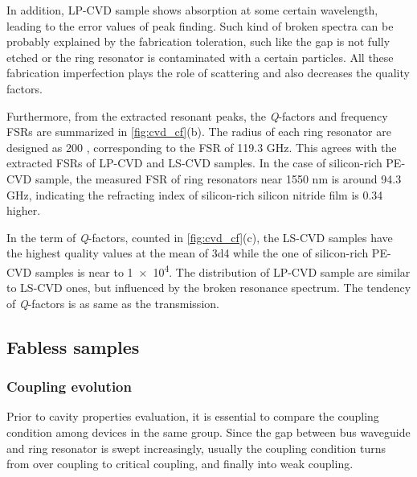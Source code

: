In addition, LP-CVD sample shows absorption at some certain wavelength, leading to the error values of peak finding. Such kind of broken spectra can be probably explained by the fabrication toleration, such like the gap is not fully etched or the ring resonator is contaminated with a certain particles. All these fabrication imperfection plays the role of scattering and also decreases the quality factors.

Furthermore, from the extracted resonant peaks, the \textit{Q}-factors and frequency FSRs are summarized in \autoref{fig:cvd_cf}(b). The radius of each ring resonator are designed as 200 \um, corresponding to the FSR of 119.3 GHz. This agrees with the extracted FSRs of LP-CVD and LS-CVD samples. In the case of silicon-rich PE-CVD sample, the measured FSR of ring resonators near 1550 nm is around 94.3 GHz, indicating the refracting index of silicon-rich silicon nitride film is 0.34 higher.

In the term of \textit{Q}-factors, counted in \autoref{fig:cvd_cf}(c), the LS-CVD samples have the highest quality values at the mean of \num{3d4} while the one of silicon-rich PE-CVD samples is near to \num{1e4}. The distribution of LP-CVD sample are similar to LS-CVD ones, but influenced by the broken resonance spectrum. The tendency of \textit{Q}-factors is as same as the transmission.

\begin{figure}
	\centering
	
	\label{fig:cvd_cf}
\end{figure}



\subsection{Fabless samples}

\subsubsection{Coupling evolution}

Prior to cavity properties evaluation, it is essential to compare the coupling condition among devices in the same group. Since the gap between bus waveguide and ring resonator is swept increasingly, usually the coupling condition turns from over coupling to critical coupling, and finally into weak coupling.

